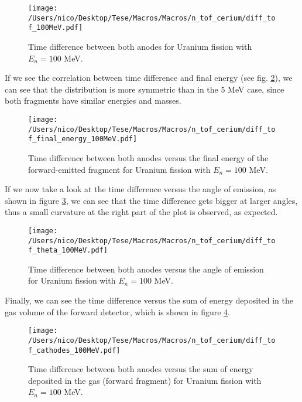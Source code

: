 \documentclass{article}
\begin{document}
\begin{figure}[H]
    \centering
    \texttt{[image: /Users/nico/Desktop/Tese/Macros/Macros/n\_tof\_cerium/diff\_tof\_100MeV.pdf]}
    \caption{Time difference between both anodes for Uranium fission with $E_n=100$ MeV.}
    \label{fig:diff_tof_100MeV}
\end{figure}
If we see the correlation between time difference and final energy (see fig. \ref{fig:time_diff_final_energy_100MeV}), we can see that the distribution is more symmetric than in the 5 MeV case, since both fragments have similar energies and masses.
\begin{figure}[H]
    \centering
    \texttt{[image: /Users/nico/Desktop/Tese/Macros/Macros/n\_tof\_cerium/diff\_tof\_final\_energy\_100MeV.pdf]}
    \caption{Time difference between both anodes versus the final energy of the forward-emitted fragment for Uranium fission with $E_n=100$ MeV.}
    \label{fig:time_diff_final_energy_100MeV}
\end{figure}
If we now take a look at the time difference versus the angle of emission, as shown in figure \ref{fig:time_diff_costheta_100MeV}, we can see that the time difference gets bigger at larger angles, thus a small curvature at the right part of the plot is observed, as expected.
\begin{figure}[H]
    \centering
    \texttt{[image: /Users/nico/Desktop/Tese/Macros/Macros/n\_tof\_cerium/diff\_tof\_theta\_100MeV.pdf]}
    \caption{Time difference between both anodes versus the angle of emission for Uranium fission with $E_n=100$ MeV.}
    \label{fig:time_diff_costheta_100MeV}
\end{figure}
Finally, we can see the time difference versus the sum of energy deposited in the gas volume of the forward detector, which is shown in figure \ref{fig:time_diff_energy_100MeV}.
\begin{figure}[H]
    \centering
    \texttt{[image: /Users/nico/Desktop/Tese/Macros/Macros/n\_tof\_cerium/diff\_tof\_cathodes\_100MeV.pdf]}
    \caption{Time difference between both anodes versus the sum of energy deposited in the gas (forward fragment) for Uranium fission with $E_n=100$ MeV.}
    \label{fig:time_diff_energy_100MeV}
\end{figure}
\end{document}
